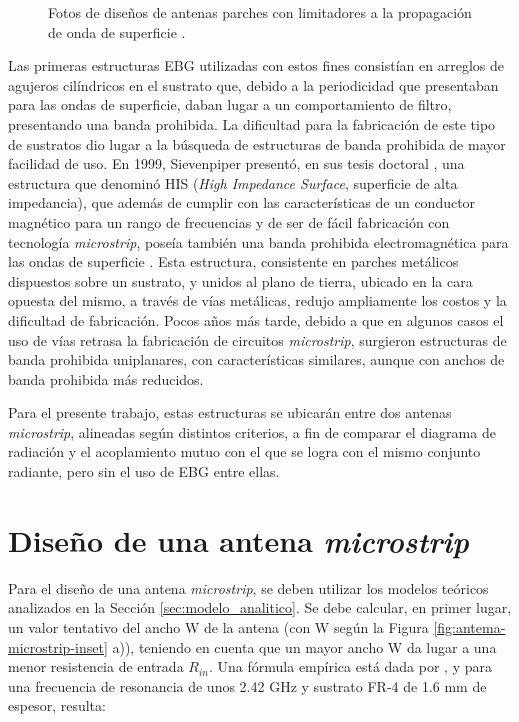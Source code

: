 \begin{figure}[H]
	\centering 
	\hspace{30pt}
	\caption{Fotos de diseños de antenas parches con limitadores a la propagación de onda de superficie \cite{Yang:EBGAntennas}.}
	\label{fig:limitadores-ondas-superficie-yang}
\end{figure}

Las primeras estructuras EBG utilizadas con estos fines consistían en arreglos de agujeros cilíndricos en el sustrato que, debido a la periodicidad que presentaban para las ondas de superficie, daban lugar a un comportamiento de filtro, presentando una banda prohibida. La dificultad para la fabricación de este tipo de sustratos dio lugar a la búsqueda de estructuras de banda prohibida de mayor facilidad de uso. En 1999, Sievenpiper presentó, en sus tesis doctoral \cite{Sievenpiper:Thesis}, una estructura que denominó HIS (\textit{High Impedance Surface}, superficie de alta impedancia), que además de cumplir con las características de un conductor magnético para un rango de frecuencias \cite{Sievenpiper:HIESForbiddenBand} y de ser de fácil fabricación con tecnología \textit{microstrip}, poseía también una banda prohibida electromagnética para las ondas de superficie \cite{Marcela:Tesis}. Esta estructura, consistente en parches metálicos dispuestos sobre un sustrato, y unidos al plano de tierra, ubicado en la cara opuesta del mismo, a través de vías metálicas, redujo ampliamente los costos y la dificultad de fabricación. Pocos años más tarde, debido a que en algunos casos el uso de vías retrasa la fabricación de circuitos \textit{microstrip}, surgieron estructuras de banda prohibida uniplanares, con características similares, aunque con anchos de banda prohibida más reducidos.

Para el presente trabajo, estas estructuras se ubicarán entre dos antenas \textit{microstrip}, alineadas según distintos criterios, a fin de comparar el diagrama de radiación y el acoplamiento mutuo con el que se logra con el mismo conjunto radiante, pero sin el uso de EBG entre ellas.


\section{Diseño de una antena \textit{microstrip}}
\label{sec_disenio_microstrip}
Para el diseño de una antena \textit{microstrip}, se deben utilizar los modelos teóricos analizados en la Sección \ref{sec:modelo_analitico}. Se debe calcular, en primer lugar, un valor tentativo del ancho W de la antena (con W según la Figura \ref{fig:antema-microstrip-inset} a)), teniendo en cuenta que un mayor ancho W da lugar a una menor resistencia de entrada $R_{in}$. Una fórmula empírica está dada por \cite{Barthia:Handbook}, y para una frecuencia de resonancia de unos 2.42 GHz y sustrato FR-4 de 1.6 mm de espesor, resulta:

